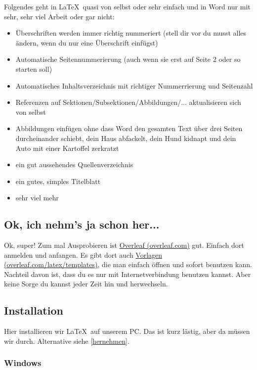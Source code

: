 \documentclass{article}
\begin{document}
Folgendes geht in \LaTeX\ quasi von selbst oder sehr einfach und in Word nur mit sehr, sehr viel Arbeit oder gar nicht:
\begin{itemize}
    \item Überschriften werden immer richtig nummeriert (stell dir vor du musst alles ändern, wenn du nur eine Überschrift einfügst)
    \item Automatische Seitennummerierung (auch wenn sie erst auf Seite 2 oder so starten soll)
    \item Automatisches Inhaltsverzeichnis mit richtiger Nummerrierung und Seitenzahl
    \item Referenzen auf Sektionen/Subsektionen/Abbildungen/... aktualisieren sich von selbst
    \item Abbildungen einfügen ohne dass Word den gesamten Text über drei Seiten durcheinander schiebt, dein Haus abfackelt, dein Hund kidnapt und dein Auto mit einer Kartoffel zerkratzt
    \item ein gut aussehendes Quellenverzeichnis
    \item ein gutes, simples Titelblatt
    \item sehr viel mehr
\end{itemize}

\subsection{Ok, ich nehm's ja schon her...} \label{hernehmen}

Ok, super! 
Zum mal Ausprobieren ist \href{https://www.overleaf.com/}{Overleaf (overleaf.com)} gut.
Einfach dort anmelden und anfangen.
Es gibt dort auch \href{https://www.overleaf.com/latex/templates}{Vorlagen (overleaf.com/latex/templates)}, die man einfach öffnen und sofort benutzen kann. \\

Nachteil davon ist, dass du es nur mit Internetverbindung benutzen kannst.
Aber keine Sorge du kannst jeder Zeit hin und herwechseln.

\subsection{Installation} \label{Installation}

Hier installieren wir \LaTeX\ auf unserem PC. 
Das ist kurz lästig, aber da müssen wir durch. Alternative siehe \autoref{hernehmen}.

\subsubsection{Windows}
\end{document}
